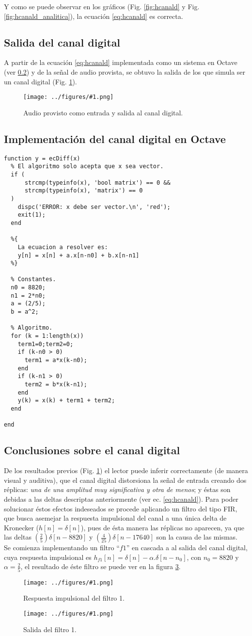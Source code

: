 \documentclass[letterpaper, 10 pt, conference]{ieeeconf}  %
\newcommand{\image}[2] {
  \begin{figure}[H]
    \centering
    \texttt{[image: ../figures/\#1.png]}
    \caption{#2}
    \label{fig:#1}
  \end{figure}
}
\begin{document}
Y como se puede observar en los gr\'aficos (Fig. \ref{fig:hcanald} y Fig. \ref{fig:hcanald_analitica}), la ecuaci\'on \ref{eq:hcanald} es correcta.

\subsection{Salida del canal digital}
A partir de la ecuaci\'on \ref{eq:hcanald} implementada como un sistema en Octave (ver \ref{code:ecdiff}) y de la se\~nal de audio provista, se obtuvo la salida de los que simula ser un canal digital (Fig. \ref{fig:salidaCanalDigital}). 
\image{salidaCanalDigital}{Audio provisto como entrada y salida al canal digital.}

\subsection{Implementaci\'on del canal digital en Octave}
\label{code:ecdiff}
\begin{lstlisting}[style=Matlab-editor]
function y = ecDiff(x)
  % El algoritmo solo acepta que x sea vector.
  if (
      strcmp(typeinfo(x), 'bool matrix') == 0 &&
      strcmp(typeinfo(x), 'matrix') == 0
  )
    dispc('ERROR: x debe ser vector.\n', 'red');
    exit(1);
  end

  %{
    La ecuacion a resolver es:
    y[n] = x[n] + a.x[n-n0] + b.x[n-n1]
  %}

  % Constantes.
  n0 = 8820;
  n1 = 2*n0;
  a = (2/5);
  b = a^2;
  
  % Algoritmo.
  for (k = 1:length(x))
    term1=0;term2=0;
    if (k-n0 > 0)
      term1 = a*x(k-n0);
    end
    if (k-n1 > 0)
      term2 = b*x(k-n1);
    end
    y(k) = x(k) + term1 + term2;
  end

end
\end{lstlisting}

\subsection{Conclusiones sobre el canal digital}
De los resultados previos (Fig. \ref{fig:salidaCanalDigital}) el lector puede inferir correctamente (de manera visual y auditiva), que el canal digital distorsiona la se\~nal de entrada creando dos r\'eplicas: \textit{una de una amplitud muy significativa y otra de menos}; y \'estas son debidas a las deltas descriptas anteriormente (ver ec. \ref{eq:hcanald}). Para poder solucionar \'estos efectos indeseados se procede aplicando un filtro del tipo FIR, que busca asemejar la respuesta impulsional del canal a una \'unica delta de Kronecker ($h[n]=\delta[n]$), pues de \'esta manera las r\'eplicas no aparecen, ya que las deltas $(\frac{2}{5})\delta[n-8820]$ y $(\frac{4}{25})\delta[n-17640]$ son la causa de las mismas. \\
Se comienza implementando un filtro ``$f1$'' en cascada a al salida del canal digital, cuya respuesta impulsional es $h_{f1}[n]=\delta[n]-\alpha.\delta[n-n_0]$, con $n_0=8820$ y $\alpha=\frac{2}{5}$, el resultado de \'este filtro se puede ver en la figura \ref{fig:y-filtro1}.
\image{h-filtro1}{Respuesta impulsional del filtro 1.}
\image{y-filtro1}{Salida del filtro 1.}
\end{document}
